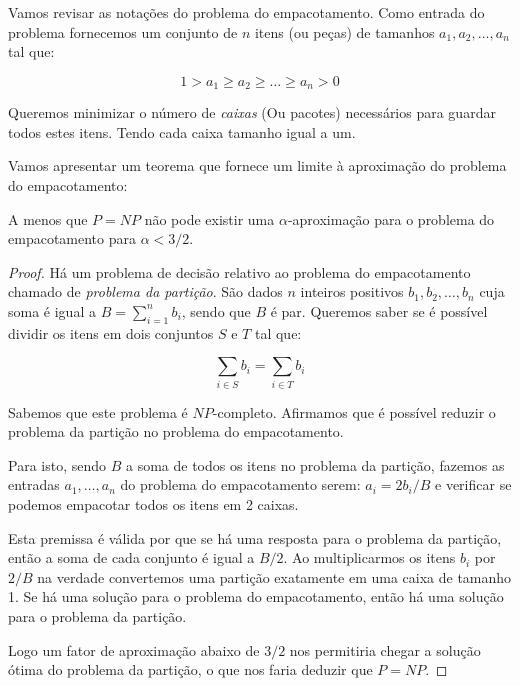 Vamos revisar as notações do problema do empacotamento. Como entrada do problema fornecemos um conjunto de $n$ itens (ou peças) de tamanhos $a_1,a_2,\ldots,a_n$ tal que:

\begin{equation}
1 > a_1 \geq a_2 \geq \ldots \geq a_n > 0 
\end{equation}

Queremos minimizar o número de \textit{caixas} (Ou pacotes) necessários para guardar todos estes itens. Tendo cada caixa tamanho igual a um.

Vamos apresentar um teorema que fornece um limite à aproximação do problema do empacotamento:

\begin{teorema}
A menos que $P=NP$ não pode existir uma $\alpha$-aproximação para o problema do empacotamento para $\alpha < 3/2$.
\end{teorema}

\begin{proof}
Há um problema de decisão relativo ao problema do empacotamento chamado de \textit{problema da partição}. São dados $n$ inteiros positivos $b_1, b_2, \ldots, b_n$ cuja soma é igual a $B = \sum_{i=1}^{n} b_i$, sendo que $B$ é par. Queremos saber se é possível dividir os itens em dois conjuntos $S$ e $T$ tal que:

\begin{equation}
\sum_{i \in S} b_i = \sum_{i \in T} b_i
\end{equation}

Sabemos que este problema é $NP$-completo. Afirmamos que é possível reduzir o problema da partição no problema do empacotamento.

Para isto, sendo $B$ a soma de todos os itens no problema da partição, fazemos as entradas $a_1, \ldots, a_n$ do problema do empacotamento serem: $a_i = 2b_i/B$ e verificar se podemos empacotar todos os itens em 2 caixas.

Esta premissa é válida por que se há uma resposta para o problema da partição, então a soma de cada conjunto é igual a $B/2$. Ao multiplicarmos os itens $b_i$ por $2/B$ na verdade convertemos uma partição exatamente em uma caixa de tamanho 1. Se há uma solução para o problema do empacotamento, então há uma solução para o problema da partição.

Logo um fator de aproximação abaixo de $3/2$ nos permitiria chegar a solução ótima do problema da partição, o que nos faria deduzir que $P=NP$.

\end{proof}

